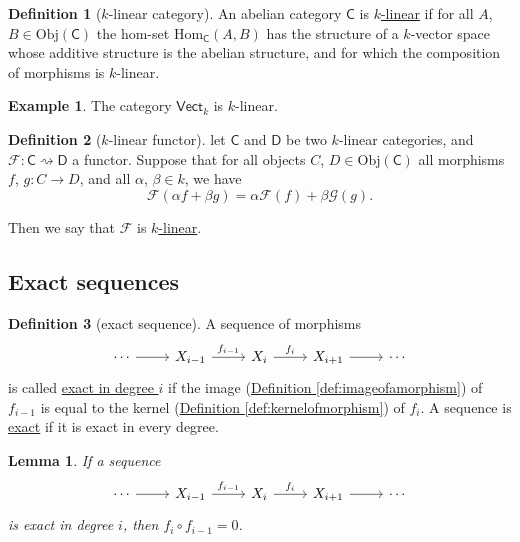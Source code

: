 \documentclass[a4paper,10pt]{scrreprt}
\newcommand{\defn}[1]{\ul{#1}}
\newcommand{\Obj}{\mathrm{Obj}}
\newcommand{\Hom}{\mathrm{Hom}}
\theoremstyle{definition}
\newtheorem{definition}{Definition}[section]
\newtheorem{example}{Example}[section]
\theoremstyle{plain}
\newtheorem{lemma}{Lemma}[section]
\theoremstyle{remark}
\begin{document}
\begin{definition}[$k$-linear category]
  \label{def:linearcategory}
  An abelian category $\mathsf{C}$ is \defn{$k$-linear} if for all $A$, $B \in \Obj(\mathsf{C})$ the hom-set $\Hom_{\mathsf{C}}(A, B)$ has the structure of a $k$-vector space whose additive structure is the abelian structure, and for which the composition of morphisms is $k$-linear.
\end{definition}

\begin{example}
  The category $\mathsf{Vect}_{k}$ is $k$-linear.
\end{example}

\begin{definition}[$k$-linear functor]
  \label{def:linearfunctor}
  let $\mathsf{C}$ and $\mathsf{D}$ be two $k$-linear categories, and $\mathcal{F}\colon \mathsf{C} \rightsquigarrow \mathsf{D}$ a functor. Suppose that for all objects $C$, $D \in \Obj(\mathsf{C})$ all morphisms $f$, $g\colon C \to D$, and all $\alpha$, $\beta \in k$, we have
  \begin{equation*}
    \mathcal{F}(\alpha f + \beta g) = \alpha \mathcal{F}(f) + \beta \mathcal{G}(g).
  \end{equation*}

  Then we say that $\mathcal{F}$ is \defn{$k$-linear}.
\end{definition}

\subsection{Exact sequences}
\begin{definition}[exact sequence]
  \label{def:exactsequence}
  A sequence of morphisms
  \begin{equation*}
    \begin{tikzcd}
      \cdots
      \arrow[r]
      & X_{i-1}
      \arrow[r, "f_{i-1}"]
      & X_{i}
      \arrow[r, "f_{i}"]
      & X_{i+1}
      \arrow[r]
      & \cdots
    \end{tikzcd}
  \end{equation*}
  is called \defn{exact in degree $i$} if the image (\hyperref[def:imageofamorphism]{Definition \ref*{def:imageofamorphism}}) of $f_{i-1}$ is equal to the kernel (\hyperref[def:kernelofmorphism]{Definition \ref*{def:kernelofmorphism}}) of $f_{i}$. A sequence is \defn{exact} if it is exact in every degree.
\end{definition}

\begin{lemma}
  If a sequence
  \begin{equation*}
    \begin{tikzcd}
      \cdots
      \arrow[r]
      & X_{i-1}
      \arrow[r, "f_{i-1}"]
      & X_{i}
      \arrow[r, "f_{i}"]
      & X_{i+1}
      \arrow[r]
      & \cdots
    \end{tikzcd}
  \end{equation*}
  is exact in degree $i$, then $f_{i} \circ f_{i-1} = 0$.
\end{lemma}
\end{document}
